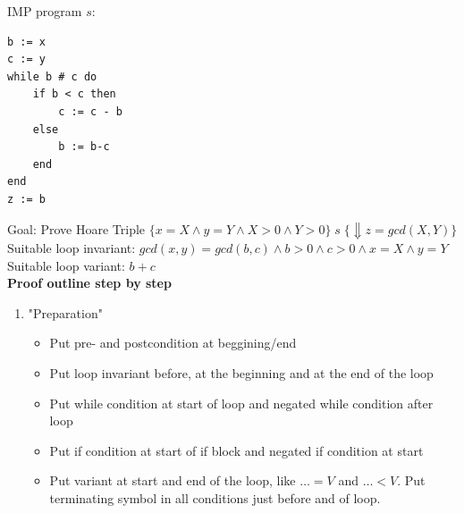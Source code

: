 \documentclass{article}
\begin{document}
IMP program $s$:
\begin{verbatim}
b := x
c := y
while b # c do
    if b < c then
        c := c - b
    else
        b := b-c
    end
end
z := b
\end{verbatim}
Goal: Prove Hoare Triple 
$\{x=X \land y=Y\land X > 0 \land Y >0\} \; s \; \{\Downarrow z=gcd(X,Y)\}$ \\
Suitable loop invariant: $gcd(x,y)=gcd(b,c) \land b >0 \land c > 0 \land x=X \land y=Y$  \\
Suitable loop variant: $b+c$ \smallskip 
\\
\textbf{Proof outline step by step}
\begin{enumerate}
    \item "Preparation"
    \begin{itemize}
        \item Put pre- and postcondition at beggining/end 
        \item Put \colorbox{blue!10}{loop invariant} before, at the beginning and at the end of the loop
        \item Put \colorbox{magenta!10}{while condition} at start of loop and negated while condition after loop 
        \item Put \colorbox{NavyBlue!10}{if condition} at start of if block and negated if condition at start
        \item Put \colorbox{teal!10}{variant} at start and end of the loop, like $\dots = V$ and $\dots < V$. Put terminating symbol in all conditions just before and of loop.
    \end{itemize}
    

\end{enumerate}
\end{document}
